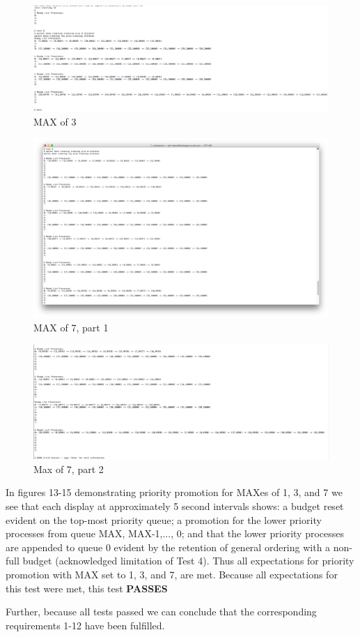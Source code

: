 \documentclass[11pt,letterpaper]{report}
\begin{document}
\begin{figure}[h]
\centering
\includegraphics[width=0.9\linewidth]{max-3.png}
\caption{MAX of 3}
\label{fig:5}
\end{figure}
\pagebreak

\begin{figure}[h]
\centering
\includegraphics[width=0.8\linewidth]{max-7a.png}
\caption{MAX of 7, part 1}
\label{fig:5}
\end{figure}

\begin{figure}[h]
\centering
\includegraphics[width=0.8\linewidth]{max-7b.png}
\caption{Max of 7, part 2}
\label{fig:5}
\end{figure}

\pagebreak
In figures 13-15 demonstrating priority promotion for MAXes of 1, 3, and 7 we see that each  display at approximately 5 second intervals shows: a budget reset 
evident on the top-most priority queue; a promotion for the lower priority processes from queue MAX, MAX-1,..., 0; and that the lower priority processes are appended to queue 0 evident by
the retention of general ordering with a non-full budget (acknowledged limitation of Test 4). Thus all expectations for priority promotion with MAX set to 1, 3, and 7, are met.
Because all expectations for this test were met, this test \textbf{PASSES}

Further, because all tests passed we can conclude that the corresponding requirements 1-12 have been fulfilled.
\end{document}
